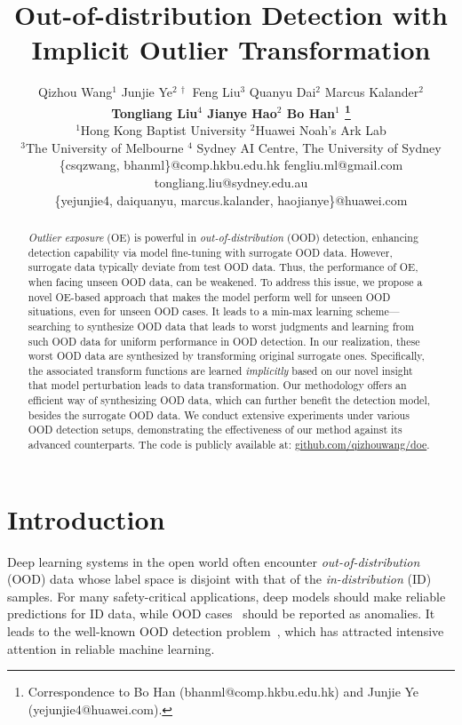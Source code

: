 \documentclass{article} \usepackage{iclr2022_conference,times}
\title{Out-of-distribution Detection with Implicit Outlier Transformation}
\author{Qizhou Wang$^{1}$ \quad Junjie Ye$^{2~\dagger}$ \quad Feng Liu$^{3}$ \quad Quanyu Dai$^{2}$ \quad Marcus Kalander$^{2}$ \\ \textbf{Tongliang Liu$^{4}$ \quad Jianye Hao$^{2}$ \quad Bo Han$^{1}$ \thanks{Correspondence to Bo Han (bhanml@comp.hkbu.edu.hk) and Junjie Ye (yejunjie4@huawei.com).}} \\
  $^1$Hong Kong Baptist University \quad
  $^2$Huawei Noah's Ark Lab \quad \\
  $^3$The University of Melbourne \quad
  $^4$ Sydney AI Centre, The University of Sydney \quad \\
  \textnormal{\{csqzwang, bhanml\}@comp.hkbu.edu.hk} \quad \textnormal{{fengliu.ml}@gmail.com} \quad \textnormal{tongliang.liu@sydney.edu.au}  \\
  \textnormal{\{yejunjie4, daiquanyu, marcus.kalander, haojianye\}@huawei.com} 
}
\begin{document}
\maketitle

\begin{abstract}



\textit{Outlier exposure} (OE) is powerful in \textit{out-of-distribution} (OOD) detection, enhancing detection capability via model fine-tuning with surrogate OOD data. However, surrogate data typically deviate from test OOD data. Thus, the performance of OE, when facing unseen OOD data, can be weakened. To address this issue, we propose a novel OE-based approach that makes the model perform well for unseen OOD situations, even for unseen OOD cases. It leads to a min-max learning scheme---searching to synthesize OOD data that leads to worst judgments and learning from such OOD data for uniform performance in OOD detection. In our realization, these worst OOD data are synthesized by transforming original surrogate ones. Specifically, the associated transform functions are learned \emph{implicitly} based on our novel insight that model perturbation leads to data transformation. Our methodology offers an efficient way of synthesizing OOD data, which can further benefit the detection model, besides the surrogate OOD data. We conduct extensive experiments under various OOD detection setups, demonstrating the effectiveness of our method against its advanced counterparts. The code is publicly available at: \href{https://github.com/QizhouWang/DOE}{{github.com/qizhouwang/doe}}.






\end{abstract}


\section{Introduction}
\label{sec: intro}


Deep learning systems in the open world often encounter \emph{out-of-distribution} (OOD) data whose label space is disjoint with that of the \emph{in-distribution} (ID) samples. For many safety-critical applications, deep models should make reliable predictions for ID data,  while OOD cases~\citep{bulusu2020anomalous} should be reported as anomalies. It leads to the well-known OOD detection problem~\citep{lee2018simple,fang2022out}, which has attracted intensive attention in reliable machine learning. 
\end{document}
